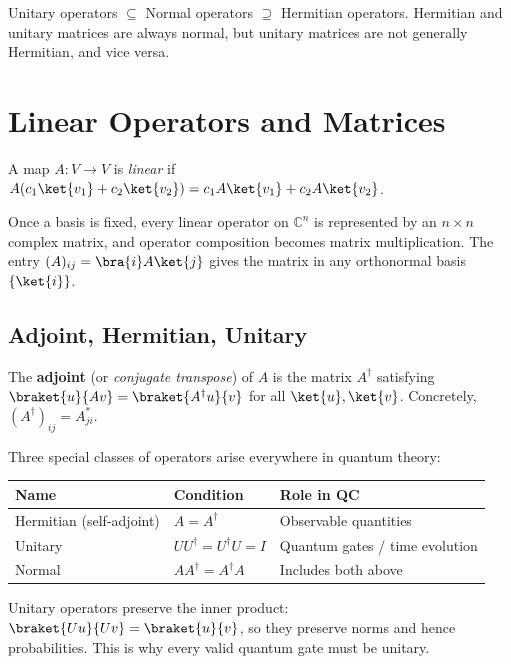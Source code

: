 \documentclass[oneside]{academica}
\begin{document}
\begin{note}
  Unitary operators $\subseteq$ Normal operators $\supseteq$ Hermitian operators.
  Hermitian and unitary matrices are always normal, but unitary matrices are not generally Hermitian, and vice versa.
\end{note}

\section{Linear Operators and Matrices}

\begin{definition*}
  A map $A:V\to V$ is \emph{linear} if $A(c_1\ket{v_1}+c_2\ket{v_2})=c_1 A\ket{v_1}+c_2 A\ket{v_2}$.
\end{definition*}

Once a basis is fixed, every linear operator on $\mathbb{C}^n$ is represented by an $n\times n$ complex matrix, and operator composition becomes matrix multiplication.
The entry $(A)_{ij}=\bra{i}A\ket{j}$ gives the matrix in any orthonormal basis $\{\ket{i}\}$.

\subsection{Adjoint, Hermitian, Unitary}

The \textbf{adjoint} (or \emph{conjugate transpose}) of $A$ is the matrix $A^\dagger$ satisfying $\braket{u}{Av}=\braket{A^\dagger u}{v}$
for all $\ket{u},\ket{v}$.
Concretely, $(A^\dagger)_{ij}=A_{ji}^*$.

Three special classes of operators arise everywhere in quantum theory:
\begin{center}
  \renewcommand{\arraystretch}{1.3}
  \begin{tabular}{l|l|l}
    \textbf{Name} & \textbf{Condition} & \textbf{Role in QC} \\
    \hline
    Hermitian (self-adjoint) & $A=A^\dagger$ & Observable quantities \\
    Unitary & $U U^\dagger = U^\dagger U = I$ & Quantum gates / time evolution \\
    Normal & $A A^\dagger = A^\dagger A$ & Includes both above \\
  \end{tabular}
\end{center}

Unitary operators preserve the inner product:
$\braket{U u}{U v}=\braket{u}{v}$, so they preserve norms and hence
probabilities.
This is why every valid quantum gate must be unitary.
\end{document}
